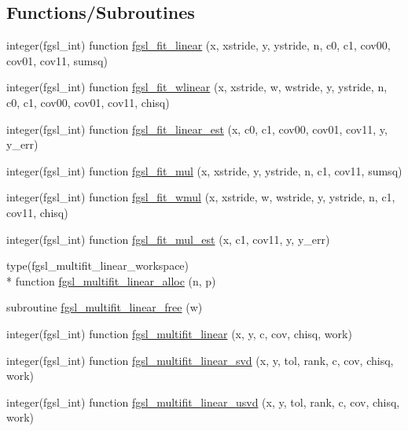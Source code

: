 \subsection*{Functions/\-Subroutines}
\begin{DoxyCompactItemize}
\item 
integer(fgsl\-\_\-int) function \hyperlink{fit_8finc_a7dbfda6efd2515a9e142a12c4c995cde}{fgsl\-\_\-fit\-\_\-linear} (x, xstride, y, ystride, n, c0, c1, cov00, cov01, cov11, sumsq)
\item 
integer(fgsl\-\_\-int) function \hyperlink{fit_8finc_a19abc39bc86162b79068c44626edb286}{fgsl\-\_\-fit\-\_\-wlinear} (x, xstride, w, wstride, y, ystride, n, c0, c1, cov00, cov01, cov11, chisq)
\item 
integer(fgsl\-\_\-int) function \hyperlink{fit_8finc_a20cd5e248d653b461490237eb98254e1}{fgsl\-\_\-fit\-\_\-linear\-\_\-est} (x, c0, c1, cov00, cov01, cov11, y, y\-\_\-err)
\item 
integer(fgsl\-\_\-int) function \hyperlink{fit_8finc_a127e1658f8bbdb60cb8bb05fe99f3330}{fgsl\-\_\-fit\-\_\-mul} (x, xstride, y, ystride, n, c1, cov11, sumsq)
\item 
integer(fgsl\-\_\-int) function \hyperlink{fit_8finc_ac340f74c0c45fa11d42988d8c8961c3d}{fgsl\-\_\-fit\-\_\-wmul} (x, xstride, w, wstride, y, ystride, n, c1, cov11, chisq)
\item 
integer(fgsl\-\_\-int) function \hyperlink{fit_8finc_a20a41d8704fb027d985e0450d6328a75}{fgsl\-\_\-fit\-\_\-mul\-\_\-est} (x, c1, cov11, y, y\-\_\-err)
\item 
type(fgsl\-\_\-multifit\-\_\-linear\-\_\-workspace) \\*
function \hyperlink{fit_8finc_a2003bf67371be173ab6c188a9fb10c4e}{fgsl\-\_\-multifit\-\_\-linear\-\_\-alloc} (n, p)
\item 
subroutine \hyperlink{fit_8finc_a8a573d86c614625296daddac17b8608e}{fgsl\-\_\-multifit\-\_\-linear\-\_\-free} (w)
\item 
integer(fgsl\-\_\-int) function \hyperlink{fit_8finc_afceca2124515ca5de8c5d5a7e9e00e3f}{fgsl\-\_\-multifit\-\_\-linear} (x, y, c, cov, chisq, work)
\item 
integer(fgsl\-\_\-int) function \hyperlink{fit_8finc_a06f9fb7626ff7c5990b16ace090076f6}{fgsl\-\_\-multifit\-\_\-linear\-\_\-svd} (x, y, tol, rank, c, cov, chisq, work)
\item 
integer(fgsl\-\_\-int) function \hyperlink{fit_8finc_a500bda5206cb389d1d76553f4129b7ed}{fgsl\-\_\-multifit\-\_\-linear\-\_\-usvd} (x, y, tol, rank, c, cov, chisq, work)

\end{DoxyCompactItemize}
